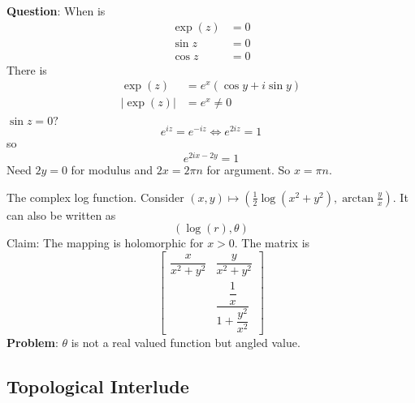 \documentclass{report}
\begin{document}
\textbf{Question}: When is 
    \begin{align*}
        \exp(z) &= 0 \\
        \sin{z} &= 0 \\
        \cos{z} &= 0   
    \end{align*}
There is 
    \begin{align*}
        \exp(z)               &= e^{x}(\cos{y} + i\sin{y}) \\
        \lvert \exp(z) \rvert &= e^{x} \neq 0              \\
    \end{align*}
$\sin{z} = 0?$
    \begin{equation*}
        e^{iz} = e^{-iz} \iff e^{2iz} = 1
    \end{equation*}
so
    \begin{equation*}
        e^{2ix  - 2y} = 1
    \end{equation*}
Need $2y = 0$ for modulus and $2x = 2\pi n$ for argument. So $x = \pi n$. 

\begin{examples}
    \begin{example}
        The complex log function. Consider $(x, y) \mapsto (\frac{1}{2} \mathop{log}(x^{2} + y^{2}), \arctan{\frac{y}{x}})$. It can also be written as 
            \begin{equation*}
                (\mathop{log}(r), \theta)
            \end{equation*}
        Claim: The mapping is holomorphic for $x > 0$. The matrix is 
            \begin{equation*}
                \begin{bmatrix}
                    \dfrac{x}{x^{2} + y^{2}} & \dfrac{y}{x^{2} + y^{2}}                       \\
                                             & \dfrac{\dfrac{1}{x}}{1 + \dfrac{y^{2}}{x^{2}}}   
                \end{bmatrix}
            \end{equation*} 
        \textbf{Problem}: $\theta$ is not a real valued function but angled value.
    \end{example}
\end{examples}

\begin{topic}
    \section{Topological Interlude}
\end{topic}
\end{document}
